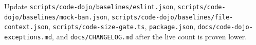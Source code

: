 \begin{itemize}
  Update \texttt{s\allowbreak{}c\allowbreak{}r\allowbreak{}i\allowbreak{}p\allowbreak{}t\allowbreak{}s\allowbreak{}/\allowbreak{}c\allowbreak{}o\allowbreak{}d\allowbreak{}e\allowbreak{}-\allowbreak{}d\allowbreak{}o\allowbreak{}j\allowbreak{}o\allowbreak{}/\allowbreak{}b\allowbreak{}a\allowbreak{}s\allowbreak{}e\allowbreak{}l\allowbreak{}i\allowbreak{}n\allowbreak{}e\allowbreak{}s\allowbreak{}/\allowbreak{}e\allowbreak{}s\allowbreak{}l\allowbreak{}i\allowbreak{}n\allowbreak{}t\allowbreak{}.\allowbreak{}j\allowbreak{}s\allowbreak{}o\allowbreak{}n}, \texttt{s\allowbreak{}c\allowbreak{}r\allowbreak{}i\allowbreak{}p\allowbreak{}t\allowbreak{}s\allowbreak{}/\allowbreak{}c\allowbreak{}o\allowbreak{}d\allowbreak{}e\allowbreak{}-\allowbreak{}d\allowbreak{}o\allowbreak{}j\allowbreak{}o\allowbreak{}/\allowbreak{}b\allowbreak{}a\allowbreak{}s\allowbreak{}e\allowbreak{}l\allowbreak{}i\allowbreak{}n\allowbreak{}e\allowbreak{}s\allowbreak{}/\allowbreak{}m\allowbreak{}o\allowbreak{}c\allowbreak{}k\allowbreak{}-\allowbreak{}b\allowbreak{}a\allowbreak{}n\allowbreak{}.\allowbreak{}j\allowbreak{}s\allowbreak{}o\allowbreak{}n}, \texttt{s\allowbreak{}c\allowbreak{}r\allowbreak{}i\allowbreak{}p\allowbreak{}t\allowbreak{}s\allowbreak{}/\allowbreak{}c\allowbreak{}o\allowbreak{}d\allowbreak{}e\allowbreak{}-\allowbreak{}d\allowbreak{}o\allowbreak{}j\allowbreak{}o\allowbreak{}/\allowbreak{}b\allowbreak{}a\allowbreak{}s\allowbreak{}e\allowbreak{}l\allowbreak{}i\allowbreak{}n\allowbreak{}e\allowbreak{}s\allowbreak{}/\allowbreak{}f\allowbreak{}i\allowbreak{}l\allowbreak{}e\allowbreak{}-\allowbreak{}c\allowbreak{}o\allowbreak{}n\allowbreak{}t\allowbreak{}e\allowbreak{}x\allowbreak{}t\allowbreak{}.\allowbreak{}j\allowbreak{}s\allowbreak{}o\allowbreak{}n}, \texttt{s\allowbreak{}c\allowbreak{}r\allowbreak{}i\allowbreak{}p\allowbreak{}t\allowbreak{}s\allowbreak{}/\allowbreak{}c\allowbreak{}o\allowbreak{}d\allowbreak{}e\allowbreak{}-\allowbreak{}s\allowbreak{}i\allowbreak{}z\allowbreak{}e\allowbreak{}-\allowbreak{}g\allowbreak{}a\allowbreak{}t\allowbreak{}e\allowbreak{}.\allowbreak{}t\allowbreak{}s}, \texttt{p\allowbreak{}a\allowbreak{}c\allowbreak{}k\allowbreak{}a\allowbreak{}g\allowbreak{}e\allowbreak{}.\allowbreak{}j\allowbreak{}s\allowbreak{}o\allowbreak{}n}, \texttt{d\allowbreak{}o\allowbreak{}c\allowbreak{}s\allowbreak{}/\allowbreak{}c\allowbreak{}o\allowbreak{}d\allowbreak{}e\allowbreak{}-\allowbreak{}d\allowbreak{}o\allowbreak{}j\allowbreak{}o\allowbreak{}-\allowbreak{}e\allowbreak{}x\allowbreak{}c\allowbreak{}e\allowbreak{}p\allowbreak{}t\allowbreak{}i\allowbreak{}o\allowbreak{}n\allowbreak{}s\allowbreak{}.\allowbreak{}m\allowbreak{}d}, and \texttt{d\allowbreak{}o\allowbreak{}c\allowbreak{}s\allowbreak{}/\allowbreak{}C\allowbreak{}H\allowbreak{}A\allowbreak{}N\allowbreak{}G\allowbreak{}E\allowbreak{}L\allowbreak{}O\allowbreak{}G\allowbreak{}.\allowbreak{}m\allowbreak{}d} after the live count is proven lower.
\end{itemize}

